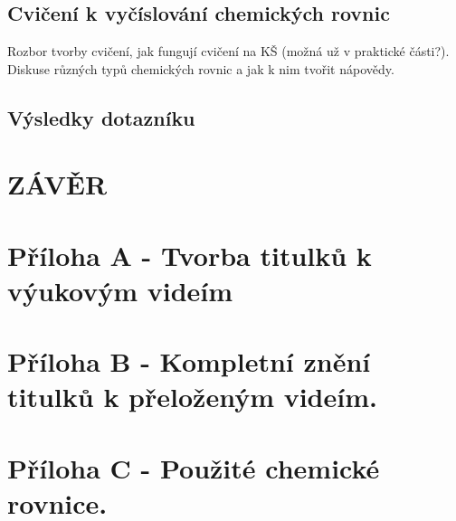 \documentclass[a4paper, 12pt]{article}
\begin{document}
\subsection{Cvičení k vyčíslování chemických rovnic}
Rozbor tvorby cvičení, jak fungují cvičení na KŠ (možná už v praktické části?).
Diskuse různých typů chemických rovnic a jak k nim tvořit nápovědy.

\subsection{Výsledky dotazníku}

\newpage
\section{ZÁVĚR}


\newpage
{}



\newpage

\appendix

\section{Příloha A - Tvorba titulků k výukovým videím}
\label{app:tvorba_titulku}

\section{Příloha B - Kompletní znění titulků k přeloženým videím.}
\label{app:cztitulky}

\section{Příloha C - Použité chemické rovnice.}
\label{app:chemrov}
\end{document}
